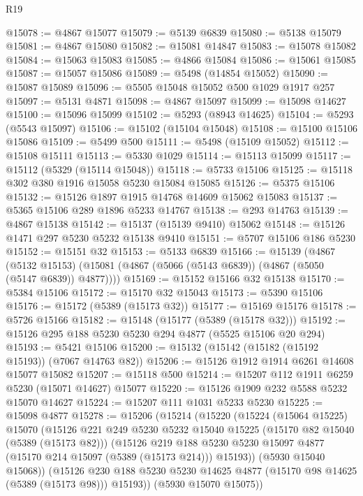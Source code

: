 \begin{lexlean}{R19}
\begin{coremodule}
@15078 := @4867 @15077
@15079 := @5139 @6839
@15080 := @5138 @15079
@15081 := @4867 @15080
@15082 := @15081 @14847
@15083 := @15078 @15082
@15084 := @15063 @15083
@15085 := @4866 @15084
@15086 := @15061 @15085
@15087 := @15057 @15086
@15089 := @5498 (@14854 @15052)
@15090 := @15087 @15089
@15096 := @5505 @15048 @15052 @500 @1029 @1917 @257
@15097 := @5131 @4871
@15098 := @4867 @15097
@15099 := @15098 @14627
@15100 := @15096 @15099
@15102 := @5293 (@8943 @14625)
@15104 := @5293 (@5543 @15097)
@15106 := @15102 (@15104 @15048)
@15108 := @15100 @15106 @15086
@15109 := @5499 @500
@15111 := @5498 (@15109 @15052)
@15112 := @15108 @15111
@15113 := @5330 @1029
@15114 := @15113 @15099
@15117 := @15112 (@5329 (@15114 @15048))
@15118 := @5733 @15106
@15125 := @15118 @302 @380 @1916 @15058 @5230 @15084 @15085
@15126 := @5375 @15106
@15132 := @15126 @1897 @1915 @14768 @14609 @15062 @15083
@15137 := @5365 @15106 @289 @1896 @5233 @14767
@15138 := @293 @14763
@15139 := @4867 @15138
@15142 := @15137 (@15139 @9410) @15062
@15148 := @15126 @1471 @297 @5230 @5232 @15138 @9410
@15151 := @5707 @15106 @186 @5230
@15152 := @15151 @32
@15153 := @5133 @6839
@15166 := @15139
    (@4867
      (@5132 @15153)
      (@15081 (@4867 (@5066 (@5143 @6839)) (@4867 (@5050 (@5147 @6839)) @4877))))
@15169 := @15152 @15166 @32 @15138
@15170 := @5384 @15106
@15172 := @15170 @32 @15043
@15173 := @5390 @15106
@15176 := @15172 (@5389 (@15173 @32))
@15177 := @15169 @15176
@15178 := @5726 @15166
@15182 := @15148 (@15177 (@5389 (@15178 @32)))
@15192 := @15126 @295 @188 @5230 @5230 @294 @4877 (@5525 @15106 @20 @294)
@15193 := @5421 @15106
@15200 := @15132 (@15142 (@15182 (@15192 @15193)) (@7067 @14763 @82))
@15206 := @15126 @1912 @1914 @6261 @14608 @15077 @15082
@15207 := @15118 @500
@15214 := @15207 @112 @1911 @6259 @5230 (@15071 @14627) @15077
@15220 := @15126 @1909 @232 @5588 @5232 @15070 @14627
@15224 := @15207 @111 @1031 @5233 @5230
@15225 := @15098 @4877
@15278 := @15206
    (@15214
      (@15220
        (@15224
          (@15064 @15225)
          @15070
          (@15126
            @221
            @249
            @5230
            @5232
            @15040
            @15225
            (@15170 @82 @15040 (@5389 (@15173 @82)))
            (@15126
              @219
              @188
              @5230
              @5230
              @15097
              @4877
              (@15170 @214 @15097 (@5389 (@15173 @214)))
              @15193))
          (@5930 @15040 @15068))
        (@15126 @230 @188 @5230 @5230 @14625 @4877 (@15170 @98 @14625 (@5389 (@15173 @98))) @15193))
      (@5930 @15070 @15075))

\end{coremodule}
\end{lexlean}
